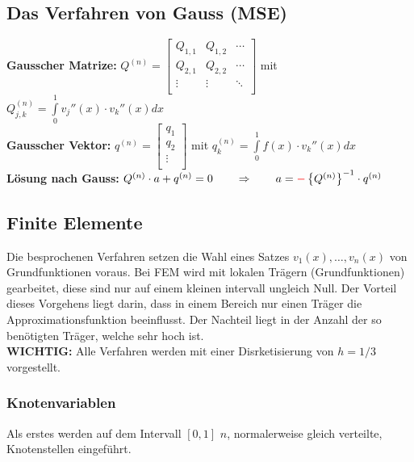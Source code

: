 \subsection{Das Verfahren von Gauss (MSE)}

\textbf{Gausscher Matrize: }
$Q^{(n)}=\begin{bmatrix}
	Q_{1,1}& Q_{1,2}&\cdots\\
	Q_{2,1}& Q_{2,2}&\cdots\\
	\vdots & \vdots &\ddots\\
\end{bmatrix}$ \qquad mit \qquad $Q_{j,k}^{(n)}=\int\limits_{0}^{1}{v_j''(x)\cdot v_k''(x) dx}$\\
\textbf{Gausscher Vektor: } 
$q^{(n)}=\begin{bmatrix}
	q_1\\
	q_2\\
	\vdots\\
\end{bmatrix}$ \qquad mit \qquad $q_{k}^{(n)}=\int\limits_{0}^{1}{f(x)\cdot v_k''(x) dx}$\\

\textbf{Lösung nach Gauss:} $Q^{(n)}\cdot a+q^{(n)}=0\qquad \Rightarrow \qquad a=\textcolor{red}{\mathbf{-}}\left\{Q^{(n)}\right\}^{-1}\cdot q^{(n)}$

\subsection{Finite Elemente}

Die besprochenen Verfahren setzen die Wahl eines Satzes $v_1(x),\ldots,v_n(x)$ von Grundfunktionen voraus. Bei FEM wird mit lokalen Trägern (Grundfunktionen) gearbeitet, diese sind nur auf einem kleinen intervall ungleich Null. Der Vorteil dieses Vorgehens liegt darin, dass in einem Bereich nur einen Träger die Approximationsfunktion beeinflusst. Der Nachteil liegt in der Anzahl der so benötigten Träger, welche sehr hoch ist.\\

\textbf{WICHTIG:} Alle Verfahren werden mit einer Disrketisierung von $h=1/3$ vorgestellt.

\subsubsection{Knotenvariablen}
Als erstes werden auf dem Intervall $[0,1]$ $n$, normalerweise gleich verteilte,   Knotenstellen eingeführt.

